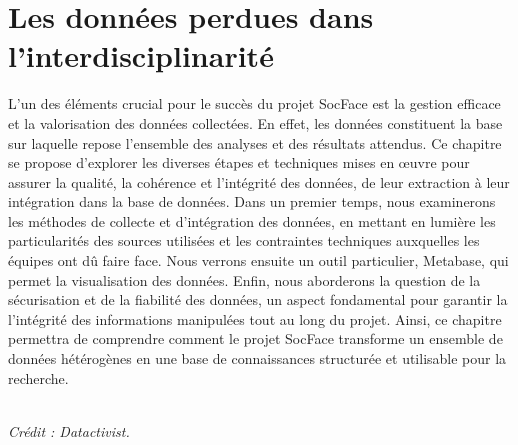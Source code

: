 \documentclass[a4paper,12pt,twoside]{book}
\begin{document}
	\part{Les données perdues dans l'interdisciplinarité}
 
L'un des éléments crucial pour le succès du projet SocFace est la gestion efficace et la valorisation des données collectées. En effet, les données constituent la base sur laquelle repose l'ensemble des analyses et des résultats attendus. Ce chapitre se propose d'explorer les diverses étapes et techniques mises en œuvre pour assurer la qualité, la cohérence et l'intégrité des données, de leur extraction à leur intégration dans la base de données. Dans un premier temps, nous examinerons les méthodes de collecte et d'intégration des données, en mettant en lumière les particularités des sources utilisées et les contraintes techniques auxquelles les équipes ont dû faire face. Nous verrons ensuite un outil particulier, Metabase, qui permet la visualisation des données. Enfin, nous aborderons la question de la sécurisation et de la fiabilité des données, un aspect fondamental pour garantir la l'intégrité des informations manipulées tout au long du projet. Ainsi, ce chapitre permettra de comprendre comment le projet SocFace transforme un ensemble de données hétérogènes en une base de connaissances structurée et utilisable pour la recherche.
\vspace*{\fill}
\begin{center}
  \setlength{\fboxsep}{5pt}  %
  \setlength{\fboxrule}{1pt} %
  \\
    \vspace{0.5em} %
    {\scriptsize \textit{Crédit : Datactivist.}}
\end{center}
\end{document}
